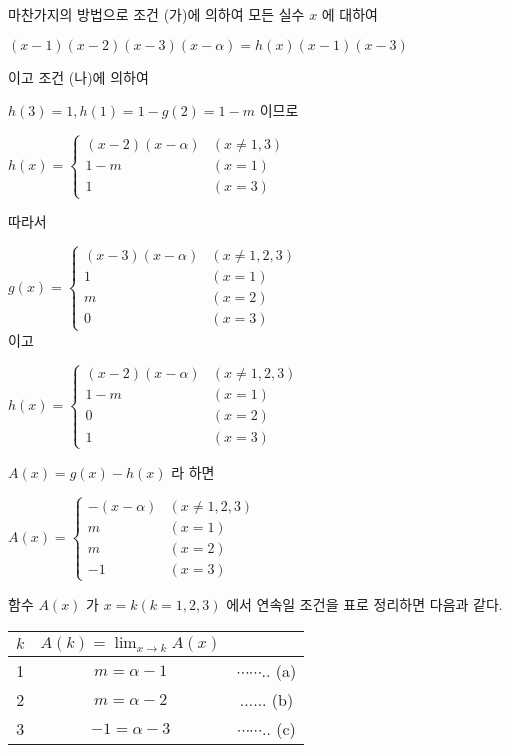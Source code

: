 \documentclass[10pt]{article}
\begin{document}
마찬가지의 방법으로 조건 (가)에 의하여 모든 실수 \(x\) 에 대하여

\((x-1)(x-2)(x-3)(x-\alpha)=h(x)(x-1)(x-3)\)

이고 조건 (나)에 의하여

\(h(3)=1, h(1)=1-g(2)=1-m\) 이므로

\(h(x)= \begin{cases}(x-2)(x-\alpha) & (x \neq 1,3) \\ 1-m & (x=1) \\ 1 & (x=3)\end{cases}\)

따라서

\(g(x)= \begin{cases}(x-3)(x-\alpha) & (x \neq 1,2,3) \\ 1 & (x=1) \\ m & (x=2) \\ 0 & (x=3)\end{cases}\)\\
이고

\(h(x)= \begin{cases}(x-2)(x-\alpha) & (x \neq 1,2,3) \\ 1-m & (x=1) \\ 0 & (x=2) \\ 1 & (x=3)\end{cases}\)

\(A(x)=g(x)-h(x)\) 라 하면

\(A(x)= \begin{cases}-(x-\alpha) & (x \neq 1,2,3) \\ m & (x=1) \\ m & (x=2) \\ -1 & (x=3)\end{cases}\)

함수 \(A(x)\) 가 \(x=k(k=1,2,3)\) 에서 연속일 조건을 표로 정리하면 다음과 같다.

\begin{center}
\begin{tabular}{|c|c|c|}
\hline
\(k\) & \(A(k)=\lim _{x \rightarrow k} A(x)\) &  \\
\hline
1 & \(m=\alpha-1\) & \(\cdots \cdots .\). (a) \\
\hline
2 & \(m=\alpha-2\) & \(\ldots . .\). (b) \\
\hline
3 & \(-1=\alpha-3\) & \(\cdots \cdots .\). (c) \\
\hline
\end{tabular}
\end{center}
\end{document}
